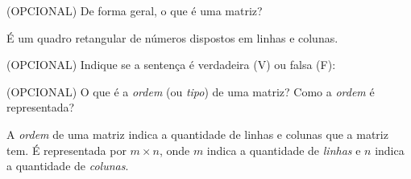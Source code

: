 \documentclass[pdftex, brazil, 12pt, oneside, addpoints]{exam}
\newcommand{\vf}[1][{}]{%
  \fillin[#1][0.25in]%
}
\begin{document}
\newpage
\begin{questions}
\setlength\linefillthickness{0.2pt}

\question
(OPCIONAL) De forma geral, o que é uma matriz?
\begin{solution}
  É um quadro retangular de números dispostos em linhas e colunas.
\end{solution}

\question
(OPCIONAL) Indique se a sentença é verdadeira (V) ou falsa (F):

\question
(OPCIONAL) O que é a \emph{ordem} (ou \emph{tipo}) de uma matriz? Como a \emph{ordem} é
representada?
\begin{solution}
  A \emph{ordem} de uma matriz indica a quantidade de linhas e colunas que a matriz
  tem. É representada por $m \times n$, onde $m$ indica a quantidade de \emph{linhas}
  e $n$ indica a quantidade de \emph{colunas}.
\end{solution}


\end{questions}
\end{document}

